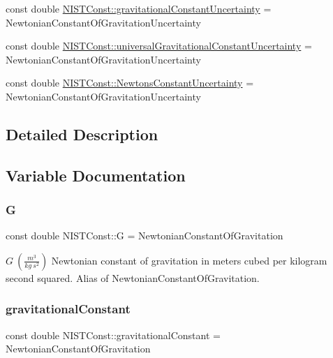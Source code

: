 \begin{DoxyCompactItemize}
\item 
const double \hyperlink{group___gravitational_constant_gae0af1dfa30856852c6c5a6936eb2354f}{N\+I\+S\+T\+Const\+::gravitational\+Constant\+Uncertainty} = Newtonian\+Constant\+Of\+Gravitation\+Uncertainty
\item 
const double \hyperlink{group___gravitational_constant_gaa748102f8262fa5e50c1d0090585593e}{N\+I\+S\+T\+Const\+::universal\+Gravitational\+Constant\+Uncertainty} = Newtonian\+Constant\+Of\+Gravitation\+Uncertainty
\item 
const double \hyperlink{group___gravitational_constant_ga53c7e14bc44763cb827de59cd3bcff2b}{N\+I\+S\+T\+Const\+::\+Newtons\+Constant\+Uncertainty} = Newtonian\+Constant\+Of\+Gravitation\+Uncertainty
\end{DoxyCompactItemize}


\subsection{Detailed Description}


\subsection{Variable Documentation}
\mbox{\label{group___gravitational_constant_gad3f54a7cdc3ea6fd2fbc4a30ce7df201}} 
\subsubsection{\texorpdfstring{G}{G}}
{\footnotesize\ttfamily const double N\+I\+S\+T\+Const\+::G = Newtonian\+Constant\+Of\+Gravitation}

$G \ (\frac{m^3}{kg\ s^2})$ Newtonian constant of gravitation in meters cubed per kilogram second squared. Alias of Newtonian\+Constant\+Of\+Gravitation. \mbox{\label{group___gravitational_constant_ga5a77947aedbfa6b29249f5b25f22137b}} 
\subsubsection{\texorpdfstring{gravitational\+Constant}{gravitationalConstant}}
{\footnotesize\ttfamily const double N\+I\+S\+T\+Const\+::gravitational\+Constant = Newtonian\+Constant\+Of\+Gravitation}

